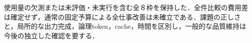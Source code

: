使用量の欠測または未評価・未実行を含む全８枠を保持した．全件比較の費用差は確定せず，通常の固定予算による全仕事改善は未確立である．課題の正しさと，局所的な出力完成，論理token，cache，時間を区別し，一般的な品質維持は今後の独立した確認を要する．
